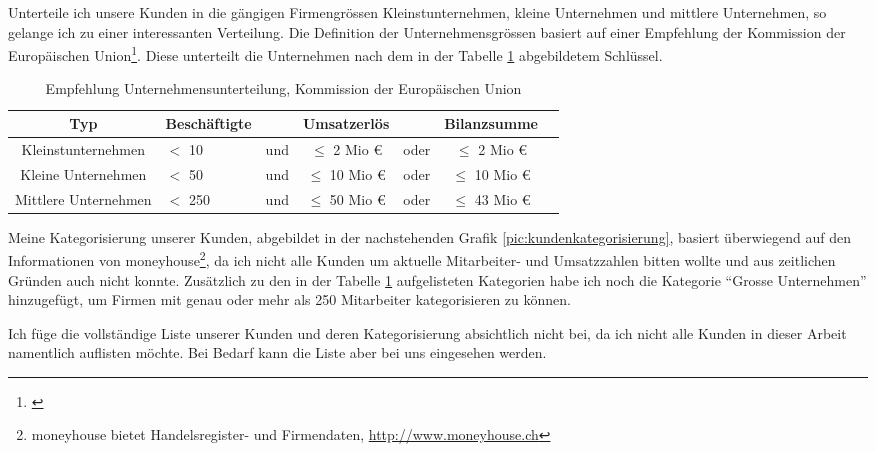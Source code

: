 Unterteile ich unsere Kunden in die gängigen Firmengrössen Kleinstunternehmen,
kleine Unternehmen und mittlere Unternehmen, so gelange ich zu einer interessanten 
Verteilung. Die Definition der Unternehmensgrössen basiert auf einer Empfehlung
der Kommission der Europäischen Union\footnote{\citealp*[Vgl.][Anhang Art. 2]{eu_komission_unternehmen}}.
Diese unterteilt die Unternehmen nach dem in der 
Tabelle \ref{tab:eu_unterteilung} abgebildetem Schlüssel.

\begin{table}[h]
\begin{center}
    \begin{tabular}{clccccc}
        \toprule \textbf{Typ} & \textbf{Beschäftigte} & & \textbf{Umsatzerlös} & & \textbf{Bilanzsumme} \\
        \midrule Kleinstunternehmen & $<$ 10 & und & $\leq$ 2 Mio \euro & oder & $\leq$ 2 Mio \euro \\
        \midrule Kleine Unternehmen & $<$ 50 & und & $\leq$ 10 Mio \euro & oder & $\leq$ 10 Mio \euro \\
        \midrule Mittlere Unternehmen & $<$ 250 & und & $\leq$ 50 Mio \euro & oder & $\leq$ 43 Mio \euro \\
        \bottomrule
    \end{tabular}
    \caption{Empfehlung Unternehmensunterteilung, Kommission der Europäischen Union}
    \label{tab:eu_unterteilung}
\end{center}
\end{table}

Meine Kategorisierung unserer Kunden, abgebildet in der nachstehenden Grafik \ref{pic:kundenkategorisierung},
basiert überwiegend auf den Informationen von moneyhouse\footnote{moneyhouse bietet Handelsregister- und Firmendaten, \url{http://www.moneyhouse.ch}}, 
da ich nicht alle Kunden um aktuelle Mitarbeiter- und Umsatzzahlen bitten wollte
und aus zeitlichen Gründen auch nicht konnte. Zusätzlich zu den in der Tabelle 
\ref{tab:eu_unterteilung} aufgelisteten Kategorien habe ich noch die Kategorie 
``Grosse Unternehmen'' hinzugefügt, um Firmen mit genau oder mehr als 250 
Mitarbeiter kategorisieren zu können.

Ich füge die vollständige Liste unserer Kunden und deren Kategorisierung absichtlich
nicht bei, da ich nicht alle Kunden in dieser Arbeit namentlich auflisten möchte.
Bei Bedarf kann die Liste aber bei uns eingesehen werden.

